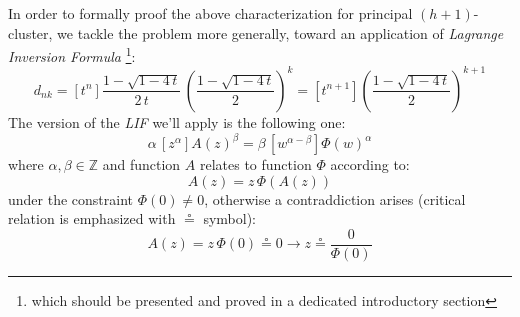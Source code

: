 \documentclass[11pt,a4paper]{article} %
\begin{document}
    In order to formally proof the above characterization for principal 
    $(h+1)$-cluster, we tackle the problem more generally, toward
    an application of \emph{Lagrange Inversion Formula} \footnote{
        which should be presented and proved in a dedicated 
        introductory section}:
    \begin{displaymath}
        d_{nk} = [t^n] \frac{1-\sqrt{1-4\,t}}{2\,t}\,
            \left(\frac{1-\sqrt{1-4\,t}}{2}\right)^{k}
               = [t^{n+1}] \left(\frac{1-\sqrt{1-4\,t}}{2}\right)^{k+1} 
    \end{displaymath}
    The version of the \emph{LIF} we'll apply is the following one:
    \begin{displaymath}
        \alpha\,\left[z^\alpha\right] A(z)^{\beta} = 
            \beta\,\left[w^{\alpha-\beta}\right]\Phi(w)^{\alpha}
    \end{displaymath}
    where $\alpha,\beta\in\mathbb{Z}$ and function $A$ relates to function
    $\Phi$ according to: 
    \begin{displaymath} A(z)=z\,\Phi(A(z)) \end{displaymath}
    under the constraint $\Phi(0)\not=0$, otherwise a contraddiction arises
    (critical relation is emphasized with $\circeq$ symbol):
    \begin{displaymath} A(z)=z\,\Phi(0) \circeq 0 \rightarrow z\circeq\frac{0}{\Phi(0)} \end{displaymath}
    
\end{document}
